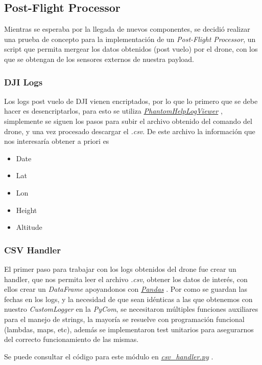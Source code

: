 \documentclass[12pt]{article}
\begin{document}
\subsection{Post-Flight Processor}
Mientras se esperaba por la llegada de nuevos componentes, se decidió realizar una prueba de concepto para la implementación de un \textit{Post-Flight Processor}, un script que permita mergear los datos obtenidos (post vuelo) por el drone, con los que se obtengan de los sensores externos de nuestra payload.

\subsubsection{DJI Logs}
Los logs post vuelo de DJI vienen encriptados, por lo que lo primero que se debe hacer es desencriptarlos, para esto se utiliza \href{https://www.phantomhelp.com/logviewer/upload/}{\textit{PhantomHelpLogViewer}} \cite{phantomhelp}, simplemente se siguen los pasos para subir el archivo obtenido del comando del drone, y una vez procesado descargar el \textit{.csv}.
De este archivo la información que nos interesaría obtener a priori es
\begin{itemize}
  \item Date
  \item Lat
  \item Lon
  \item Height
  \item Altitude
\end{itemize}
\newpage
\subsubsection{CSV Handler}
El primer paso para trabajar con los logs obtenidos del drone fue crear un handler, que nos permita leer el archivo \textit{.csv}, obtener los datos de interés, con ellos crear un \textit{DataFrame} apoyandonos con \href{https://pandas.pydata.org/}{\textit{Pandas}} \cite{pydata}.
\newline
Por como se guardan las fechas en los logs, y la necesidad de que sean idénticas a las que obtenemos con nuestro \textit{CustomLogger} en la \textit{PyCom}, se necesitaron múltiples funciones auxiliares para el manejo de strings, la mayoría se resuelve con programación funcional (lambdas, maps, etc), además se implementaron test unitarios para asegurarnos del correcto funcionamiento de las mismas.

Se puede consultar el código para este módulo en \href{https://github.com/sofia-am/DJI\_Payload\_Development/blob/main/log/post\_flight\_logger\_processor/src/csv\_handler.py}{\textit{csv\_handler.py}} \cite{repo2}.
\end{document}
